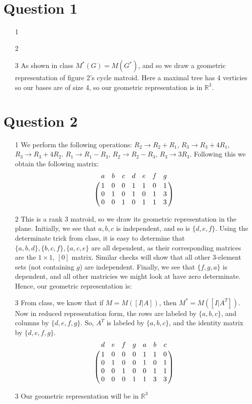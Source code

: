 \documentclass{article}
\author{Ben Shirley}
\begin{document}
\section*{Question 1}
\begin{enumerate}
    \item[1]
    \item[2]
    \item[3] As shown in class $M^*(G)=M(G^*)$,
        and so we draw a geometric representation of figure 2's 
        cycle matroid. Here a maximal tree has 4 verticies so 
        our bases are of size 4, so our geometric representation is in $\mathbb{R}^3$.

\end{enumerate}

\section*{Question 2}
\begin{enumerate}
    \item[1] We perform the following operations: $R_2\to R_2+R_1$, $R_3\to R_3+4R_1$, $R_3\to R_3+4R_2$.
        $R_1\to R_1-R_3$, $R_2\to R_2-R_3$, $R_3\to 3R_3$.
        Following this we obtain the following matrix:
        \[
            \bordermatrix{
                & a & b & c & d & e & f & g \cr
                & 1 & 0 & 0 & 1 & 1 & 0 & 1 \cr
                & 0 & 1 & 0 & 1 & 0 & 1 & 3 \cr
                & 0 & 0 & 1 & 0 & 1 & 1 & 3 
            }
        \]
    \item[2] This is a rank 3 matroid, so we draw its geometric representation in the plane.
        Initially, we see that $a, b, c$ is independent, and so is $\{d, e, f\}$. Using the determinate 
        trick from class, it is easy to determine that $\{a, b, d\}, \{b, c, f\}, \{a, c, e\}$ are all dependent,
        as their corresponding matrices are the $1\times 1$, $[0]$ matrix. Similar checks will show that all other 3-element sets (not containing $g$)
        are independent. Finally, we see that $\{f, g, a\}$ is dependent, and all other matricies we might look at have zero determinate. 
        Hence, our geometric representation is:

    \item[3] From class, we know that if $M=M([I|A])$, then $M^*=M([I|A^T])$. Now in reduced representation form, the rows are labeled by $\{a, b, c\}$,
        and columns by $\{d, e, f, g\}$. So, $A^T$ is labeled by $\{a, b, c\}$, and the identity matrix by $\{d, e, f, g\}$.
        \[
            \bordermatrix{
                & d & e & f & g & a & b & c \cr
                & 1 & 0 & 0 & 0 & 1 & 1 & 0 \cr
                & 0 & 1 & 0 & 0 & 1 & 0 & 1 \cr
                & 0 & 0 & 1 & 0 & 0 & 1 & 1 \cr
                & 0 & 0 & 0 & 1 & 1 & 3 & 3 
            }
        \]
    \item[3] Our geometric representation will be in $\mathbb{R}^3$
\end{enumerate}
\end{document}
